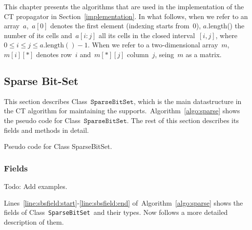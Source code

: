 \documentclass[a4paper,11pt]{article}
\newcommand{\Todo}[1]{{\color{blue}#1}}
\newcommand{\Chapref}[1]{Section~\ref{#1}}
\newcommand{\Algoref}[1]{Algorithm~\ref{#1}}
\newcommand{\Linesref}[2]{Lines~\ref{#1}-\ref{#2}}
\newcommand{\Mask}{\texttt{mask}}
\newcommand{\SparseBitSet}{\texttt{SparseBitSet}}
\newcommand{\function}[1]{\mathrm{#1}}
\numberwithin{equation}{section}
\begin{document}
This chapter presents the algorithms that are used in the implementation of the
CT propagator in \Chapref{implementation}. In what follows, when we refer to
an array~$a$,~$a[0]$ denotes the first element (indexing starts from~$0$),
$a$.length() the number of its cells and~$a[i:j]$ all its cells in the closed
interval~$[i,j]$, where~$0 \leq i \leq j \leq a.\function{length}() - 1$.
When we refer to a two-dimensional array~$m$,~$m[i][*]$ denotes
row~$i$ and~$m[*][j]$ column~$j$, seing~$m$ as a matrix.

\subsection{Sparse Bit-Set}
This section describes Class~$\SparseBitSet$, which is the main datastructure
in the CT algorithm for maintaining the supports.~\Algoref{algo:sparse} shows the
pseudo code for Class~$\SparseBitSet$. The rest of this section describes its
fields and methods in detail.

\begin{algorithm}[H]
  \begin{algorithmic}[1]  %
    
    \end{algorithmic}
  \caption{Pseudo code for Class SparseBitSet.}
  \label{algo:sparse}
\end{algorithm}

\subsubsection{Fields}

\Todo{Todo: Add examples.}

\Linesref{line:sbsfield:start}{line:sbsfield:end} of~\Algoref{algo:sparse} shows the fields
of Class~\SparseBitSet~and their types. Now follows a more detailed description of them.
\end{document}
